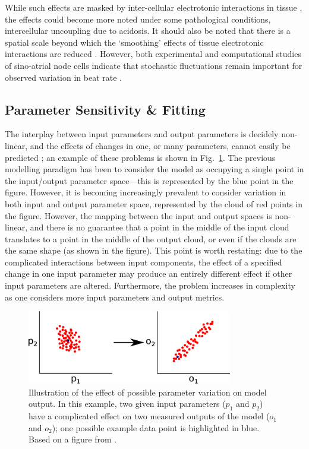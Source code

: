 \documentclass[../thesis-main.tex]{subfiles}
\begin{document}
While such effects are masked by inter-cellular electrotonic interactions in tissue \citep{Zaniboni2000, Heijman2013}, the effects could become more noted under some pathological conditions, \eg{} intercellular uncoupling due to acidosis. It should also be noted that there is a spatial scale beyond which the `smoothing' effects of tissue electrotonic interactions are reduced \citep{Xie2007, Sato2009}. However, both experimental and computational studies of sino-atrial node cells indicate that stochastic fluctuations remain important for observed variation in beat rate \citep{Ponard2007}.

\subsection{Parameter Sensitivity \& Fitting}
\label{subsec:param-sensitivity}
The interplay between input parameters and output parameters is decidely non-linear, and the effects of changes in one, or many parameters, cannot easily be predicted \citep{Sarkar2012}; an example of these problems is shown in Fig.~\ref{fig:param-var-effect}. The previous modelling paradigm has been to consider the model as occupying a single point in the input/output parameter space---this is represented by the blue point in the figure. However, it is becoming increasingly prevalent to consider variation in both input and output parameter space, represented by the cloud of red points in the figure. However, the mapping between the input and output spaces is non-linear, and there is no guarantee that a point in the middle of the input cloud translates to a point in the middle of the output cloud, or even if the clouds are the same shape (as shown in the figure). This point is worth restating: due to the complicated interactions between input components, the effect of a specified change in one input parameter may produce an entirely different effect if other input parameters are altered. Furthermore, the problem increases in complexity as one considers more input parameters and output metrics.
\begin{figure}
 \centering
 \includegraphics[width=0.8\textwidth]{param-var-effect}
 \caption[Effect of parameter variation on model output.]{Illustration of the effect of possible parameter variation on model output. In this example, two given input parameters ($p_1$ and $p_2$) have a complicated effect on two measured outputs of the model ($o_1$ and $o_2$); one possible example data point is highlighted in blue. Based on a figure from \citet{Sarkar2012}.}
 \label{fig:param-var-effect}
\end{figure}
\end{document}
